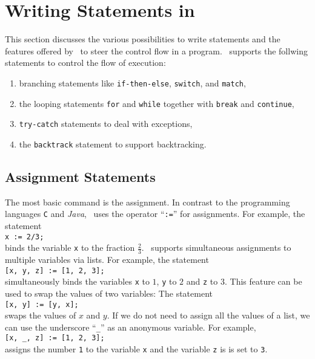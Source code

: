 \chapter{Writing Statements in \setlx}
This section discusses the various possibilities to write statements and the 
features offered by \setlx\ to steer the control flow in a program.
\setlx\ supports the follwing statements to control the flow of execution:
\begin{enumerate}
\item branching statements like \texttt{if-then-else}, \texttt{switch}, and \texttt{match},
\item the looping statements \texttt{for} and \texttt{while} together with \texttt{break} and
      \texttt{continue}, 
\item \texttt{try-catch} statements to deal with exceptions,
\item the \texttt{backtrack} statement to support backtracking.
\end{enumerate}

\section{Assignment Statements}
The most basic command is the assignment.  In contrast to the programming languages \texttt{C}
and \textsl{Java}, \setlx\ uses the operator ``\texttt{:=}'' for assignments.  For example, the statement
\\[0.2cm]
\hspace*{1.3cm}
\texttt{x := 2/3;}
\\[0.2cm]
binds the variable \texttt{x} to the fraction $\frac{2}{3}$.  \setlx\ supports simultaneous
assignments to multiple variables via lists.  For example, the statement
\\[0.2cm]
\hspace*{1.3cm}
\texttt{[x, y, z] := [1, 2, 3];}
\\[0.2cm]
simultaneously binds the variables \texttt{x} to $1$, \texttt{y} to $2$ and \texttt{z} to $3$.
This feature can be used to swap the values of two variables:  The statement
\\[0.2cm]
\hspace*{1.3cm}
\texttt{[x, y] := [y, x];}
\\[0.2cm]
swaps the values of $x$ and $y$.  If we do not need to assign all the values of a list, we
can use the underscore ``\texttt{\_}'' as an anonymous variable.  For example,
\\[0.2cm]
\hspace*{1.3cm}
\texttt{[x, \_, z] := [1, 2, 3];} 
\\[0.2cm]
assigns the number \texttt{1} to the variable \texttt{x} and the variable \texttt{z} is
is set to \texttt{3}.

